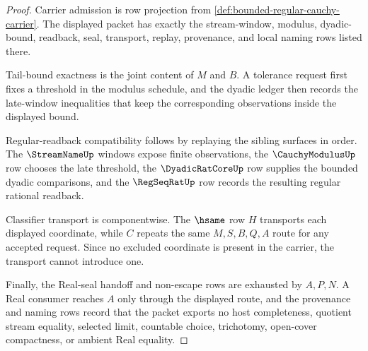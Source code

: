 \begin{proof}
Carrier admission is row projection from \autoref{def:bounded-regular-cauchy-carrier}. The displayed packet has exactly the stream-window, modulus, dyadic-bound, readback, seal, transport, replay, provenance, and local naming rows listed there.

Tail-bound exactness is the joint content of $M$ and $B$. A tolerance request first fixes a threshold in the modulus schedule, and the dyadic ledger then records the late-window inequalities that keep the corresponding observations inside the displayed bound.

Regular-readback compatibility follows by replaying the sibling surfaces in order. The $\StreamNameUp$ windows expose finite observations, the $\CauchyModulusUp$ row chooses the late threshold, the $\DyadicRatCoreUp$ row supplies the bounded dyadic comparisons, and the $\RegSeqRatUp$ row records the resulting regular rational readback.

Classifier transport is componentwise. The $\hsame$ row $H$ transports each displayed coordinate, while $C$ repeats the same $M,S,B,Q,A$ route for any accepted request. Since no excluded coordinate is present in the carrier, the transport cannot introduce one.

Finally, the Real-seal handoff and non-escape rows are exhausted by $A,P,N$. A Real consumer reaches $A$ only through the displayed route, and the provenance and naming rows record that the packet exports no host completeness, quotient stream equality, selected limit, countable choice, trichotomy, open-cover compactness, or ambient Real equality.
\end{proof}

